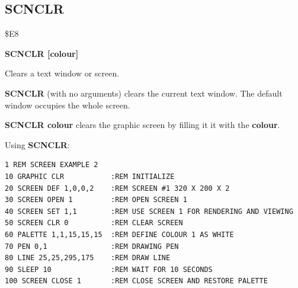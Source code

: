\subsection{SCNCLR}
\begin{description}[leftmargin=2cm,style=nextline]
\item [Token:] \$E8
\item [Format:] {\bf SCNCLR [colour]}
\item [Usage:] Clears a text window or screen.

               {\bf SCNCLR} (with no arguments) clears the
               current text window. The default window
               occupies the whole screen.

               {\bf SCNCLR colour} clears the graphic screen by
               filling it it with the {\bf colour}.

\item [Example:] Using {\bf SCNCLR}:
\begin{tcolorbox}[colback=black,coltext=white]
\verbatimfont{\codefont}
\begin{verbatim}
1 REM SCREEN EXAMPLE 2
10 GRAPHIC CLR           :REM INITIALIZE
20 SCREEN DEF 1,0,0,2    :REM SCREEN #1 320 X 200 X 2
30 SCREEN OPEN 1         :REM OPEN SCREEN 1
40 SCREEN SET 1,1        :REM USE SCREEN 1 FOR RENDERING AND VIEWING
50 SCREEN CLR 0          :REM CLEAR SCREEN
60 PALETTE 1,1,15,15,15  :REM DEFINE COLOUR 1 AS WHITE
70 PEN 0,1               :REM DRAWING PEN
80 LINE 25,25,295,175    :REM DRAW LINE
90 SLEEP 10              :REM WAIT FOR 10 SECONDS
100 SCREEN CLOSE 1       :REM CLOSE SCREEN AND RESTORE PALETTE
\end{verbatim}
\end{tcolorbox}
\end{description}


\newpage
